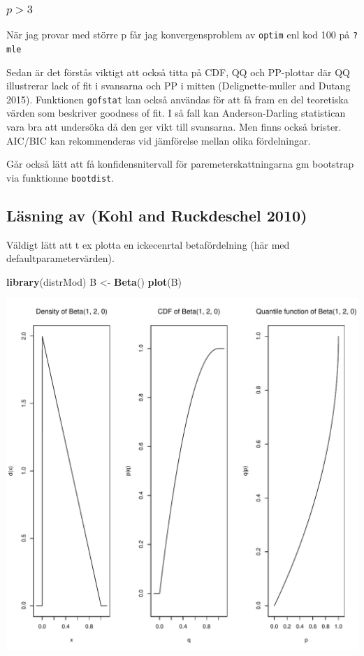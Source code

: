 \documentclass[]{article}
\newenvironment{Shaded}{\begin{snugshade}}{\end{snugshade}}
\newcommand{\KeywordTok}[1]{\textcolor[rgb]{0.13,0.29,0.53}{\textbf{{#1}}}}
\newcommand{\StringTok}[1]{\textcolor[rgb]{0.31,0.60,0.02}{{#1}}}
\newcommand{\NormalTok}[1]{{#1}}
\begin{document}
\subsubsection{\texorpdfstring{\(p > 3\)}{p \textgreater{} 3}}\label{p-3-1}

När jag provar med större p får jag konvergensproblem av \texttt{optim}
enl kod 100 på \texttt{?mle}

Sedan är det förstås viktigt att också titta på CDF, QQ och PP-plottar
där QQ illustrerar lack of fit i svansarna och PP i mitten
(Delignette-muller and Dutang 2015). Funktionen \texttt{gofstat} kan
också användas för att få fram en del teoretiska värden som beskriver
goodness of fit. I så fall kan Anderson-Darling statistican vara bra att
undersöka då den ger vikt till svansarna. Men finns också brister.
AIC/BIC kan rekommenderas vid jämförelse mellan olika fördelningar.

Går också lätt att få konfidensnitervall för paremeterskattningarna gm
bootstrap via funktionne \texttt{bootdist}.

\subsection{Läsning av (Kohl and Ruckdeschel
2010)}\label{lasning-av-distrmod}

Väldigt lätt att t ex plotta en ickecenrtal betafördelning (här med
defaultparametervärden).

\begin{Shaded}
\begin{Highlighting}[]
\KeywordTok{library}\NormalTok{(distrMod)}
\NormalTok{B <-}\StringTok{ }\KeywordTok{Beta}\NormalTok{()}
\KeywordTok{plot}\NormalTok{(B)}
\end{Highlighting}
\end{Shaded}

\includegraphics{2016_w09_files/figure-latex/unnamed-chunk-16-1.pdf}
\end{document}

